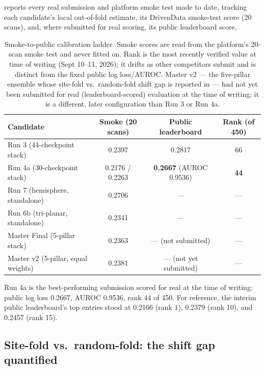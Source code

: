 \documentclass[11pt]{article}
\begin{document}
 reports every real submission and platform smoke test made to date, tracking each candidate's local out-of-fold estimate, its DrivenData smoke-test score (20 scans), and, where submitted for real scoring, its public leaderboard score.

\begin{table}[t]
\centering
\small
\caption{Smoke-to-public calibration ladder. Smoke scores are read from the platform's 20-scan smoke test and never fitted on. Rank is the most recently verified value at time of writing (Sept 10--11, 2026); it drifts as other competitors submit and is distinct from the fixed public log loss/AUROC. Master v2 --- the five-pillar ensemble whose site-fold vs.\ random-fold shift gap is reported in  --- had not yet been submitted for real (leaderboard-scored) evaluation at the time of writing; it is a different, later configuration than Run 3 or Run 4a.}
\label{tab:ladder}
\begin{tabular}{@{}lccc@{}}
\toprule
\textbf{Candidate} & \textbf{Smoke (20 scans)} & \textbf{Public leaderboard} & \textbf{Rank (of 450)} \\
\midrule
Run 3 (44-checkpoint stack) & 0.2397 & 0.2817 & 66 \\
Run 4a (30-checkpoint stack) & 0.2176 / 0.2263 & \textbf{0.2667} (AUROC 0.9536) & \textbf{44} \\
Run 7 (hemisphere, standalone) & 0.2706 & --- & --- \\
Run 6b (tri-planar, standalone) & 0.2341 & --- & --- \\
Master Final (5-pillar stack) & 0.2363 & --- (not submitted) & --- \\
Master v2 (5-pillar, equal weights) & 0.2381 & --- (not yet submitted) & --- \\
\bottomrule
\end{tabular}
\end{table}

Run 4a is the best-performing submission scored for real at the time of writing: public log loss 0.2667, AUROC 0.9536, rank 44 of 450. For reference, the interim public leaderboard's top entries stood at 0.2166 (rank 1), 0.2379 (rank 10), and 0.2457 (rank 15).

\subsection{Site-fold vs.\ random-fold: the shift gap quantified}
\label{sec:shiftgap-results}
\end{document}
